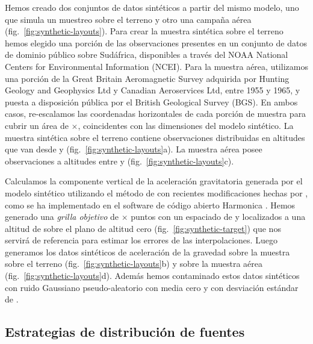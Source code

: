 Hemos creado dos conjuntos de datos sintéticos a partir del mismo modelo, uno
que simula un muestreo sobre el terreno y otro una campaña aérea
(fig.~\ref{fig:synthetic-layouts}).
Para crear la muestra sintética sobre el terreno hemos elegido una porción de
las observaciones presentes en un conjunto de datos de dominio público sobre
Sudáfrica, disponibles a través del NOAA National Centers for Environmental
Information (NCEI). Para la muestra aérea, utilizamos una porción de la Great
Britain Aeromagnetic Survey adquirida por Hunting Geology and Geophysics Ltd
y Canadian Aeroservices Ltd, entre 1955 y 1965, y puesta a disposición pública
por el British Geological Survey (BGS).
En ambos casos, re-escalamos las coordenadas horizontales de cada porción de
muestra para cubrir un área de \SurveyEasting{}$\times$\SurveyNorthing{},
coincidentes con las dimensiones del modelo sintético.
La muestra sintética sobre el terreno contiene \GroundSurveyPoints{}
observaciones distribuidas en altitudes que van desde \GroundSurveyMinHeight{}
y \GroundSurveyMaxHeight{} (fig.~\ref{fig:synthetic-layouts}a).
La muestra aérea posee \AirborneSurveyPoints{} observaciones a altitudes entre
\AirborneSurveyMinHeight{} y \AirborneSurveyMaxHeight{}
(fig.~\ref{fig:synthetic-layouts}c).

Calculamos la componente vertical de la aceleración gravitatoria generada por
el modelo sintético utilizando el método de \citet{nagy2000, nagy2002} con
recientes modificaciones hechas por \citet{fukushima2020}, como se ha
implementado en el software de código abierto Harmonica \citep{harmonica2021}.
Hemos generado una \emph{grilla objetivo} de
\TargetEastingSize{}$\times$\TargetNorthingSize{} puntos con un espaciado de
\TargetSpacing{} y localizados a una altitud de \TargetHeight{} sobre el plano
de altitud cero (fig.~\ref{fig:synthetic-target}) que nos servirá de referencia
para estimar los errores de las interpolaciones.
Luego generamos los datos sintéticos de aceleración de la gravedad sobre la
muestra sobre el terreno (fig.~\ref{fig:synthetic-layouts}b) y sobre la muestra
aérea (fig.~\ref{fig:synthetic-layouts}d).
Además hemos contaminado estos datos sintéticos con ruido Gaussiano
pseudo-aleatorio con media cero y con desviación estándar de \SurveyNoise{}.


\subsection{Estrategias de distribución de fuentes}
\label{sec:synthetic_distributions}

